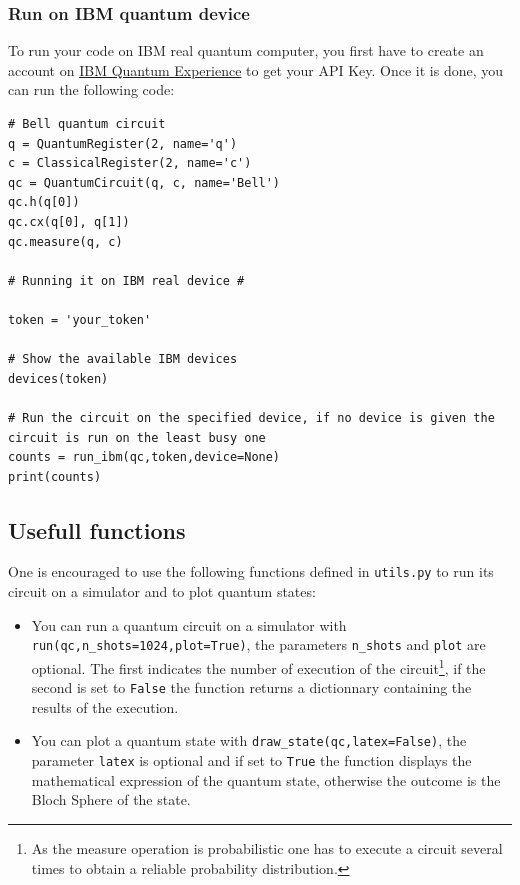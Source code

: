 \documentclass{article}
\begin{document}
\subsubsection{Run on IBM quantum device}

To run your code on IBM real quantum computer, you first have to create an account on \href{https://quantum-computing.ibm.com/}{IBM Quantum Experience} to get your API Key. Once it is done, you can run the following code:

\begin{verbatim}
# Bell quantum circuit
q = QuantumRegister(2, name='q')
c = ClassicalRegister(2, name='c')
qc = QuantumCircuit(q, c, name='Bell')
qc.h(q[0])
qc.cx(q[0], q[1])
qc.measure(q, c)

# Running it on IBM real device #

token = 'your_token'

# Show the available IBM devices
devices(token)

# Run the circuit on the specified device, if no device is given the circuit is run on the least busy one
counts = run_ibm(qc,token,device=None)
print(counts)
\end{verbatim}

\subsection{Usefull functions}

One is encouraged to use the following functions defined in \verb|utils.py| to run its circuit on a simulator and to plot quantum states:
\begin{itemize}
    \item You can run a quantum circuit on a simulator with \verb|run(qc,n_shots=1024,plot=True)|, the parameters \verb|n_shots| and \verb|plot| are optional. The first indicates the number of execution of the circuit\footnote{As the measure operation is probabilistic one has to execute a circuit several times to obtain a reliable probability distribution.}, if the second is set to \verb|False| the function returns a dictionnary containing the results of the execution.
    \item You can plot a quantum state with \verb|draw_state(qc,latex=False)|, the parameter \verb|latex| is optional and if set to \verb|True| the function displays the mathematical expression of the quantum state, otherwise the outcome is the Bloch Sphere of the state.
\end{itemize}
\end{document}
